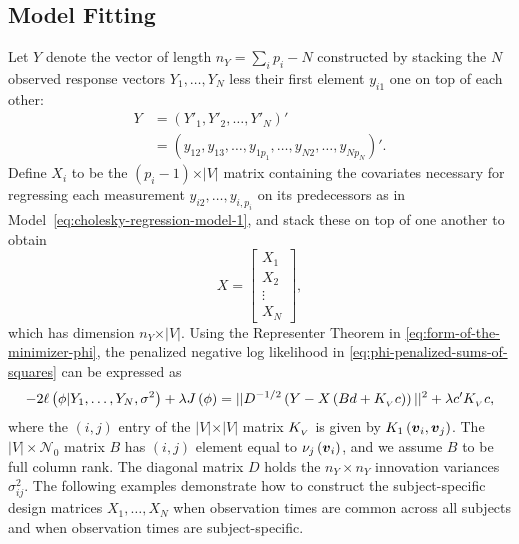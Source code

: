 \subsection{Model Fitting}

Let $Y$ denote the vector of length $n_Y= \sum_{i} p_i - N$  constructed by stacking the $N$ observed response vectors $Y_1,\dots, Y_N$ less their first element $y_{i1}$ one on top of each other:
\begin{align}\label{eq:stacked-response-vector}
Y &= \left( Y'_1, Y'_2, \dots, Y'_{N} \right)'\\
 &= \left( y_{12}, y_{13},\dots, y_{1p_1}, \dots, y_{N2},\dots, y_{Np_N} \right)'.
\end{align}
\noindent
Define $X_i$ to be the $\left(p_i-1\right) \times \vert V \vert$ matrix containing the covariates necessary for regressing each measurement $y_{i2}, \dots, y_{i,p_i}$ on its predecessors as in Model~\eqref{eq:cholesky-regression-model-1}, and stack these on top of one another to obtain
\begin{equation} \label{eq:ar-design-matrix-1}
X = \begin{bmatrix}
X_1 \\
X_2\\
\vdots \\
X_N
\end{bmatrix},
\end{equation}
\noindent
which has dimension $n_Y \times \vert V \vert$. Using the Representer Theorem in \eqref{eq:form-of-the-minimizer-phi}, the penalized negative log likelihood in \eqref{eq:phi-penalized-sums-of-squares} can be expressed as
\begin{equation} \label{eq:penalized-likelihood-vectorized}
-2\ell\left(\phi \vert Y_1,\dots, Y_N, \sigma^2\right) + \lambda J\left(\phi\right) = \vert \vert D^{-1/2}\left( Y - X \left( Bd + K_{_{\scriptscriptstyle V}}c \right) \right) \vert \vert^2  + \lambda c^\prime K_{_{\scriptscriptstyle V}} c, 
\end{equation}
\noindent
where the $\left(i,j\right)$ entry of the $\vert V \vert \times \vert V \vert$ matrix $K_{_{\scriptscriptstyle V}}$ is given by $K_1\left(\mbox{\boldmath $v$}_i, \mbox{\boldmath $v$}_j\right)$. The $\vert V \vert \times \mathcal{N}_0$ matrix $B$ has $\left(i,j\right)$ element equal to $\nu_j\left(\mbox{\boldmath $v$}_i\right)$, and we assume $B$ to be full column rank.  The diagonal matrix $D$ holds the $n_Y \times n_Y$  innovation variances $\sigma^2_{ij}$. The following examples demonstrate how to construct the subject-specific design matrices $X_1,\dots, X_N$ when observation times are common across all subjects and when observation times are subject-specific.

